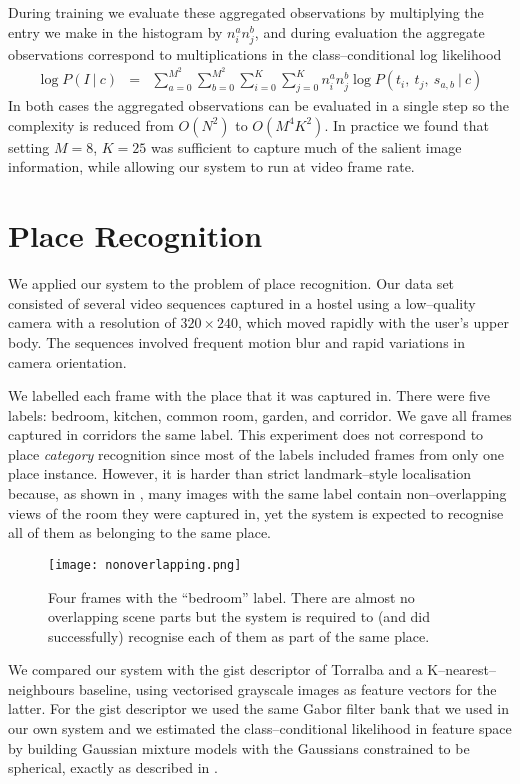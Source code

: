 During training we evaluate these aggregated observations by
multiplying the entry we make in the histogram by $n^a_i n^b_j$, and
during evaluation the aggregate observations correspond to
multiplications in the class--conditional log likelihood
\begin{eqnarray}
\log P(I ~|~ c) & = & \sum_{a=0}^{M^2} \sum_{b=0}^{M^2} \sum_{i=0}^K  \sum_{j=0}^K
 n^a_in^b_j \log P(t_i, ~ t_j, ~ s_{a,b} ~|~ c)
\end{eqnarray}
In both cases the aggregated observations can be evaluated in a single
step so the complexity is reduced from $O(N^2)$ to $O(M^4 K^2)$. In
practice we found that setting $M$$=$$8$, $K$$=$$25$ was sufficient to capture
much of the salient image information, while allowing our system to run
at video frame rate.

\section{Place Recognition}
\label{sec:place-recognition}
We applied our system to the problem of place recognition. Our data
set consisted of several video sequences captured in a hostel
using a low--quality camera with a resolution of $320 \times 240$,
which moved rapidly with the user's upper body. The sequences involved
frequent motion blur and rapid variations in camera orientation.

We labelled each frame with the place that it was captured in. There
were five labels: bedroom, kitchen, common room, garden, and
corridor. We gave all frames captured in corridors the same
label. This experiment does not correspond to place {\em category}
recognition since most of the labels included frames from only one
place instance. However, it is harder than strict landmark--style
localisation because, as shown in , many images
with the same label contain non--overlapping views of the room they
were captured in, yet the system is expected to recognise all of them
as belonging to the same place.

\begin{figure}[htp]
  \centering
  \texttt{[image: nonoverlapping.png]}
  \caption{Four frames with the ``bedroom'' label. There are almost no
    overlapping scene parts but the system is required to (and did
    successfully) recognise each of them as part of the same place.}
  \label{fig:nonoverlapping}
\end{figure}

We compared our system with the gist descriptor of Torralba \etal and
a K--nearest--neighbours baseline, using vectorised grayscale images
as feature vectors for the latter. For the gist descriptor we used the
same Gabor filter bank that we used in our own system and we estimated
the class--conditional likelihood in feature space by building
Gaussian mixture models with the Gaussians constrained to be
spherical, exactly as described in \cite{Torralba03}.

